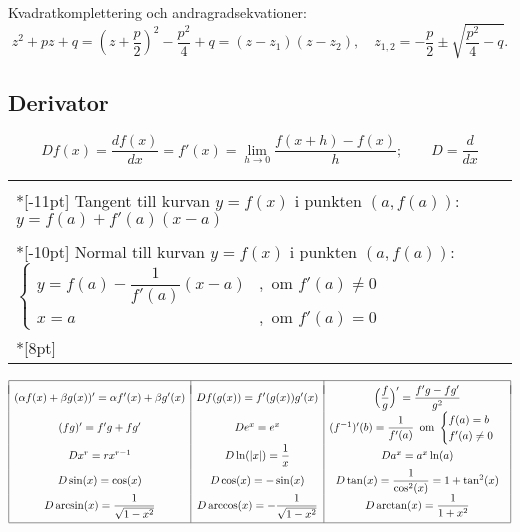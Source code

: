 \documentclass{article}
\newcommand{\D}{D}
\begin{document}
Kvadratkomplettering och andragradsekvationer:
\[
z^2+pz+q
  =\left(z+\frac{p}{2}\right)^2-\frac{p^2}{4}+q
  =(z-z_1)(z-z_2)
  ,\quad
  z_{1,2}=-\frac{p}{2}\pm\sqrt{\frac{p^2}{4}-q}.
\]

\vspace{-1em}


\vspace{-5pt}
\subsection*{Derivator}%

$$Df(x)=\frac{df(x)}{dx}=f'(x)
=\lim_{h\rightarrow 0}\frac{f(x+h)-f(x)}{h}; 
\qquad D=\frac d{dx}
$$


     \begin{tabular}[m]{|l|}
        \hline  \\*[-11pt] 
       Tangent till kurvan $y=f(x)$ i punkten $(a,f(a))$: 
        \; $y=f(a)+f'(a)(x-a)$\\
       \hline  \\*[-10pt]
       Normal till kurvan $y=f(x)$ i punkten $(a,f(a))$: 
       $\begin{cases}
         y=f(a)-\dfrac1{f'(a)}(x-a)&, 
         \text{ om } f'(a)\neq0\\ 
         x=a&, \text{ om } f'(a)=0
         \end{cases}$ \\*[8pt]
       \hline
     \end{tabular} 

\medskip

$\begin{array}{|c|c|c|}\hline & &\\*[-8pt]
(\alpha f(x)+\beta g(x))'=\alpha f'(x)+\beta g'(x)& 
\D f(g(x))=f'(g(x))g'(x)  
&\Bigl(\dfrac{f}{g}\Bigr)'
 =\dfrac{f'g-fg'}{g^2}
\EndRow
(fg)'=f'g+fg' & \D e^x = e^x &
(f^{-1})'(b) = \dfrac1{f'(a)}\,\mbox{ om } 
\begin{cases}
f(a)=b\\f'(a)\neq0    %
\end{cases}
\EndRow
\D x^r=rx^{r-1}
&   \D\ln(|x|)=\dfrac{1}{x} &\D a^x=a^x\ln(a) 
\EndRow
 \D\sin(x)=\cos(x) & \D\cos(x)=-\sin(x) &
  \D\tan(x)=\dfrac{1}{\cos^2(x)}=1+\tan^2(x)
\EndRow
\D\arcsin(x)=\dfrac{1}{\sqrt{1-x^2}} &
\D\arccos(x)=-\dfrac{1}{\sqrt{1-x^2}} &
\D\arctan(x)=\dfrac{1}{1+x^2}
\\*[9pt]
\hline
\end{array}$
\end{document}
